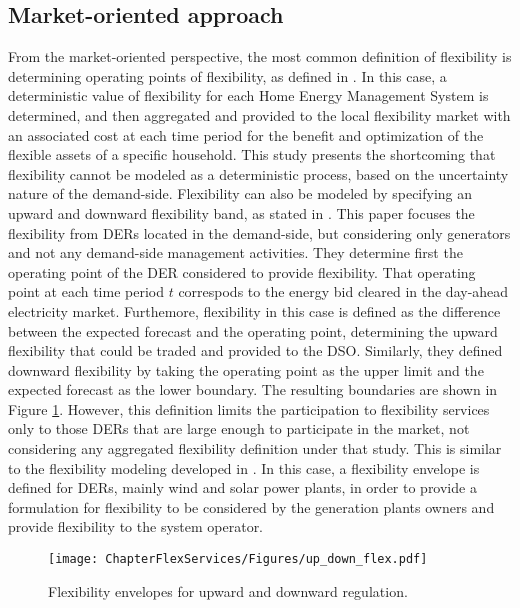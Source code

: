 \subsection{Market-oriented approach}
From the market-oriented perspective, the most common definition of flexibility is determining operating points of flexibility, as defined in \cite{Olivella-Rosell2018}. In this case, a deterministic value of flexibility for each Home Energy Management System is determined, and then aggregated and provided to the local flexibility market with an associated cost at each time period for the benefit and optimization of the flexible assets of a specific household. This study presents the shortcoming that flexibility cannot be modeled as a deterministic process, based on the uncertainty nature of the demand-side. Flexibility can also be modeled by specifying an upward and downward flexibility band, as stated in \cite{Soares2017}. This paper focuses the flexibility from DERs located in the demand-side, but considering only generators and not any demand-side management activities. They determine first the operating point of the DER considered to provide flexibility. That operating point at each time period $t$ correspods to the energy bid cleared in the day-ahead electricity market. Furthemore, flexibility in this case is defined as the difference between the expected forecast and the operating point, determining the upward flexibility that could be traded and provided to the DSO. Similarly, they defined downward flexibility by taking the operating point as the upper limit and the expected forecast as the lower boundary. The resulting boundaries are shown in Figure \ref{fig:envelopes}. However, this definition limits the participation to flexibility services only to those DERs that are large enough to participate in the market, not considering any aggregated flexibility definition under that study. This is similar to the flexibility modeling developed in \cite{Nosair2015}. In this case, a flexibility envelope is defined for DERs, mainly wind and solar power plants, in order to provide a formulation for flexibility to be considered by the generation plants owners and provide flexibility to the system operator. 

\begin{figure}[htbp]
	\centering
	\texttt{[image: ChapterFlexServices/Figures/up\_down\_flex.pdf]}
		\caption{Flexibility envelopes for upward and downward regulation.}
	\label{fig:envelopes}  
\end{figure}

